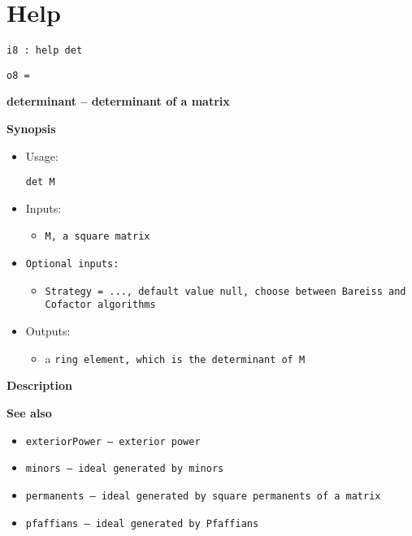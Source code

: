 \documentclass[12pt,a4paper]{amsart}
\begin{document}
\section{Help}
\begin{verbatim}
i8 : help det
\end{verbatim}
\noindent\verb|o8 = |
\par \medskip\noindent\begingroup\Large\bf
determinant -- determinant of a matrix\endgroup
\par \smallskip%

\par \medskip\noindent\begingroup\Large\bf
Synopsis\endgroup
\par \smallskip%
\begin{itemize}
\item 
\par Usage: 
\par \begingroup\tt det\ M\endgroup{}
\item Inputs:\begin{itemize}
\item \begingroup\tt M\endgroup{}, a square \begingroup\tt matrix\endgroup{}
\end{itemize}

\item \begingroup\tt Optional\ inputs\endgroup{}:\begin{itemize}
\item \begingroup\tt Strategy\endgroup{}\begingroup\tt \ ={}\ \endgroup{}\begingroup\tt ...\endgroup{}, default value null, choose between Bareiss and Cofactor algorithms
\end{itemize}

\item Outputs:\begin{itemize}
\item a \begingroup\tt ring\ element\endgroup{}, which is the determinant of \begingroup\tt M\endgroup{}
\end{itemize}

\end{itemize}

\par \medskip\noindent\begingroup\Large\bf
Description\endgroup
\par \smallskip%

\par \medskip\noindent\begingroup\Large\bf
See also\endgroup
\par \smallskip%
\begin{itemize}
\item \begingroup\tt exteriorPower\endgroup{} -- exterior power
\item \begingroup\tt minors\endgroup{} -- ideal generated by minors
\item \begingroup\tt permanents\endgroup{} -- ideal generated by square permanents of a matrix
\item \begingroup\tt pfaffians\endgroup{} -- ideal generated by Pfaffians
\end{itemize}
\end{document}
